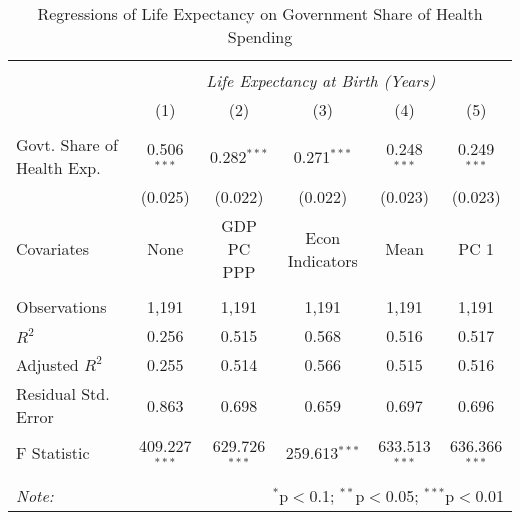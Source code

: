 \begin{table}[!htbp] \centering
  \caption{Regressions of Life Expectancy on Government Share of Health Spending \label{main_regs}}
\begin{tabular}{@{\extracolsep{5pt}}lccccc}
\\[-1.8ex]\hline
\hline \\[-1.8ex]
& \multicolumn{5}{c}{\textit{Life Expectancy at Birth (Years)}} \
\cr \
\\[-1.8ex] & (1) & (2) & (3) & (4) & (5) \\
\hline \\[-1.8ex]
 Govt. Share of Health Exp. & 0.506$^{***}$ & 0.282$^{***}$ & 0.271$^{***}$ & 0.248$^{***}$ & 0.249$^{***}$ \\
  & (0.025) & (0.022) & (0.022) & (0.023) & (0.023) \\
 Covariates & None & GDP PC PPP & Econ Indicators & Mean & PC 1 \\
\hline \\[-1.8ex]
 Observations & 1,191 & 1,191 & 1,191 & 1,191 & 1,191 \\
 $R^2$ & 0.256 & 0.515 & 0.568 & 0.516 & 0.517 \\
 Adjusted $R^2$ & 0.255 & 0.514 & 0.566 & 0.515 & 0.516 \\
 Residual Std. Error & 0.863 & 0.698 & 0.659 & 0.697 & 0.696  \\
 F Statistic & 409.227$^{***}$  & 629.726$^{***}$  & 259.613$^{***}$  & 633.513$^{***}$  & 636.366$^{***}$  \\
\hline
\hline \\[-1.8ex]
\textit{Note:} & \multicolumn{5}{r}{$^{*}$p$<$0.1; $^{**}$p$<$0.05; $^{***}$p$<$0.01} \\
\end{tabular}
\end{table}